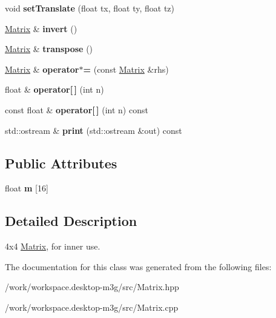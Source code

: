 \begin{CompactItemize}
\item 
\hypertarget{classm3g_1_1Matrix_550cf39dca5ec8d74d719b0dcdecdd4b}{
void \textbf{setTranslate} (float tx, float ty, float tz)}
\label{classm3g_1_1Matrix_550cf39dca5ec8d74d719b0dcdecdd4b}

\item 
\hypertarget{classm3g_1_1Matrix_f26a87130b4bbc951b85074a8c308a0e}{
\hyperlink{classm3g_1_1Matrix}{Matrix} \& \textbf{invert} ()}
\label{classm3g_1_1Matrix_f26a87130b4bbc951b85074a8c308a0e}

\item 
\hypertarget{classm3g_1_1Matrix_d27ed380c287f6489575eb838010cf72}{
\hyperlink{classm3g_1_1Matrix}{Matrix} \& \textbf{transpose} ()}
\label{classm3g_1_1Matrix_d27ed380c287f6489575eb838010cf72}

\item 
\hypertarget{classm3g_1_1Matrix_5d28596666a27f88d74bacceaef9b326}{
\hyperlink{classm3g_1_1Matrix}{Matrix} \& \textbf{operator$\ast$=} (const \hyperlink{classm3g_1_1Matrix}{Matrix} \&rhs)}
\label{classm3g_1_1Matrix_5d28596666a27f88d74bacceaef9b326}

\item 
\hypertarget{classm3g_1_1Matrix_014a3abc30da6ad739fcce9aa3fa28fe}{
float \& \textbf{operator\mbox{[}$\,$\mbox{]}} (int n)}
\label{classm3g_1_1Matrix_014a3abc30da6ad739fcce9aa3fa28fe}

\item 
\hypertarget{classm3g_1_1Matrix_7aa4dbded39fe1de76fbb0f81b57085e}{
const float \& \textbf{operator\mbox{[}$\,$\mbox{]}} (int n) const }
\label{classm3g_1_1Matrix_7aa4dbded39fe1de76fbb0f81b57085e}

\item 
\hypertarget{classm3g_1_1Matrix_6fea17fa1532df3794f8cb39cb4f911f}{
std::ostream \& \textbf{print} (std::ostream \&out) const }
\label{classm3g_1_1Matrix_6fea17fa1532df3794f8cb39cb4f911f}

\end{CompactItemize}
\subsection*{Public Attributes}
\begin{CompactItemize}
\item 
\hypertarget{classm3g_1_1Matrix_68147cce833d98b698183d68629e38d5}{
float \textbf{m} \mbox{[}16\mbox{]}}
\label{classm3g_1_1Matrix_68147cce833d98b698183d68629e38d5}

\end{CompactItemize}


\subsection{Detailed Description}
4x4 \hyperlink{classm3g_1_1Matrix}{Matrix}, for inner use. 

The documentation for this class was generated from the following files:\begin{CompactItemize}
\item 
/work/workspace.desktop-m3g/src/Matrix.hpp\item 
/work/workspace.desktop-m3g/src/Matrix.cpp\end{CompactItemize}
